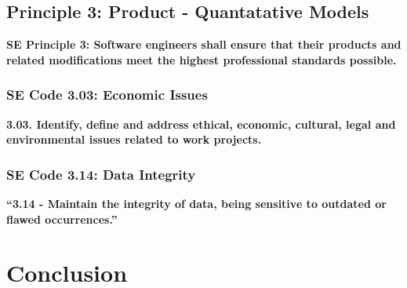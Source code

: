 \documentclass[11pt]{article}
\begin{document}
\begin{multicols}{2}
\subsection{Principle 3: Product - Quantatative Models}

\textbf{SE Principle 3: Software engineers shall ensure that their products and related modifications meet the highest professional standards possible.}

\subsubsection{SE Code 3.03: Economic Issues}

   \textbf{3.03. Identify, define and address ethical, economic, cultural, legal and environmental issues related to work projects.}

\subsubsection{SE Code 3.14: Data Integrity}


   \textbf{``3.14 - Maintain the integrity of data, being sensitive to outdated or flawed occurrences.''}



\section{Conclusion}

\end{multicols}
\newpage


\nocite{*}




\end{document}
